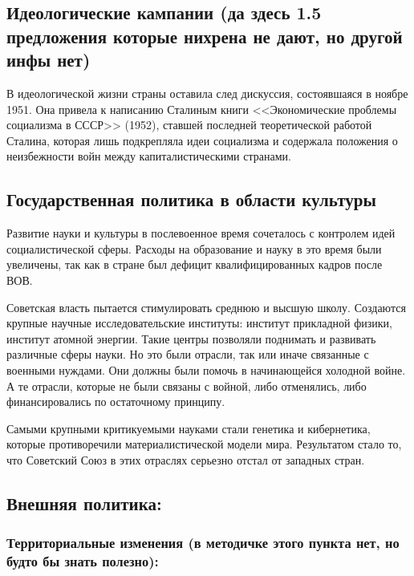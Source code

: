 \subsection{Идеологические кампании (да здесь 1.5 предложения которые нихрена не дают, но другой инфы нет)}

В идеологической жизни страны оставила след дискуссия, состоявшаяся в ноябре 1951. Она привела к написанию Сталиным книги <<Экономические проблемы социализма в СССР>> (1952), ставшей последней теоретической работой Сталина, которая лишь подкрепляла идеи социализма и  содержала положения о неизбежности войн между капиталистическими странами.

\subsection{Государственная политика в области культуры}

Развитие науки и культуры в послевоенное время сочеталось с контролем идей социалистической сферы. Расходы на образование и науку в это время были увеличены, так как в стране был дефицит квалифицированных кадров после ВОВ. 

Советская власть пытается стимулировать среднюю и высшую школу. Создаются крупные научные исследовательские институты: институт прикладной физики, институт атомной энергии. Такие центры позволяли поднимать и развивать различные сферы науки. Но это были отрасли, так или иначе связанные с военными нуждами. Они должны были помочь в начинающейся холодной войне. А те отрасли, которые не были связаны с войной, либо отменялись, либо финансировались по остаточному принципу. 

Самыми крупными критикуемыми науками стали генетика и кибернетика, которые противоречили материалистической модели мира. Результатом стало то, что Советский Союз в этих отраслях серьезно отстал от западных стран.

\subsection{Внешняя политика:}

\subsubsection{\textbf{Территориальные изменения (в методичке этого пункта нет, но будто бы знать полезно):}}

